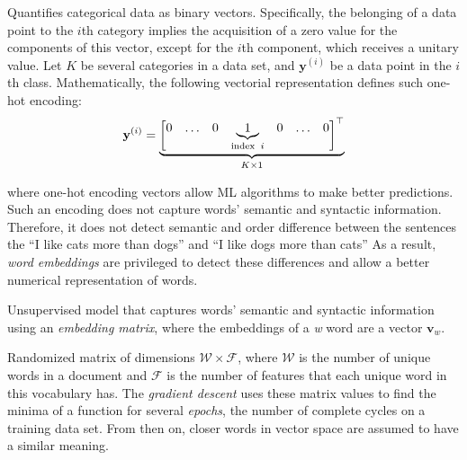\begin{definition}
  Quantifies categorical data as binary vectors. Specifically, the belonging of
  a data point to the $i$th category implies the acquisition of a zero value for
  the components of this vector, except for the $i$th component, which receives a
  unitary value.  Let $K$ be several categories in a data set, and
  $\mathbf{y}^{(i)}$ be a data point in the $i$th class. Mathematically, the
  following vectorial representation defines such one-hot encoding:
  \begin{equation}
    \textbf{y}^{(i)} = \underbrace{\begin{bmatrix}0 & \ldots & 0 &
        \underbrace{1}_{\textup{index} \;\; i} &0 & \ldots  &
        0\end{bmatrix}^\top}_{K \times 1}
    \label{eq:one-hot:encoding}
  \end{equation}

  where one-hot encoding vectors allow ML algorithms to make better
  predictions. Such an encoding does not capture words' semantic and syntactic
  information. Therefore, it does not detect semantic and order difference between
  the sentences the ``I like cats more than dogs'' and ``I like dogs more than
  cats'' As a result, \emph{word embeddings} are privileged to detect these
  differences and allow a better numerical representation of words.
  \label{def:one-hot:encoding}
\end{definition}

\begin{definition}
  Unsupervised model that captures words' semantic and syntactic information
  using an \emph{embedding matrix}, where the embeddings of a \textit{w} word are
  a vector $\mathbf{v}_w$.
  \label{def:word:embeddings}
\end{definition}

\begin{definition}
  Randomized matrix of dimensions $\mathcal{W} \times \mathcal{F}$, where
  $\mathcal{W}$ is the number of unique words in a document and $\mathcal{F}$ is
  the number of features that each unique word in this vocabulary has. The
  \emph{gradient descent} uses these matrix values to find the minima of a
  function for several \emph{epochs}, the number of complete cycles on a training
  data set. From then on, closer words in vector space are assumed to have a
  similar meaning.
  \label{def:embedding:matrix}
\end{definition}

